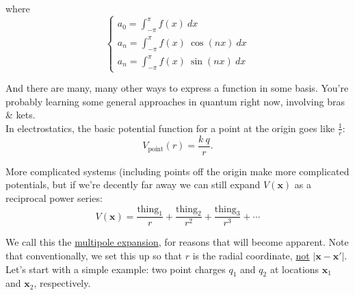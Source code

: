 \documentclass{article}
\numberwithin{equation}{section}
\begin{document}
where
\begin{equation*}
    \begin{cases} \displaystyle a_0 = \int_{-\pi}^{\pi} f(x)\ dx \\[0.3cm] \displaystyle a_n = \int_{-\pi}^{\pi} f(x)\ \cos{(nx)}\ dx \\[0.3cm] \displaystyle a_n = \int_{-\pi}^{\pi} f(x)\ \sin{(nx)}\ dx \end{cases}
\end{equation*}

And there are many, many other ways to express a function in some basis. You're probably learning some general approaches in quantum right now, involving bras \& kets. \\

In electrostatics, the basic potential function for a point at the origin goes like $\displaystyle \frac{1}{r}$:
\begin{equation*}
    V_{\text{point}}(r) = \frac{k\ q}{r}.
\end{equation*}

More complicated systems (including points off the origin make more complicated potentials, but if we're decently far away we can still expand $V(\bm{x})$ as a reciprocal power series:
\begin{equation*}
    V(\bm{x}) = \frac{\text{thing}_1}{r} + \frac{\text{thing}_2}{r^2} + \frac{\text{thing}_3}{r^3} + \cdots
\end{equation*}

We call this the \underline{multipole expansion}, for reasons that will become apparent. Note that conventionally, we set this up so that $r$ is the radial coordinate, \underline{not} $\left| \bm{x} - \bm{x'} \right|$. \\

Let's start with a simple example: two point charges $q_1$ and $q_2$ at locations $\bm{x}_1$ and $\bm{x}_2$, respectively.
\end{document}
